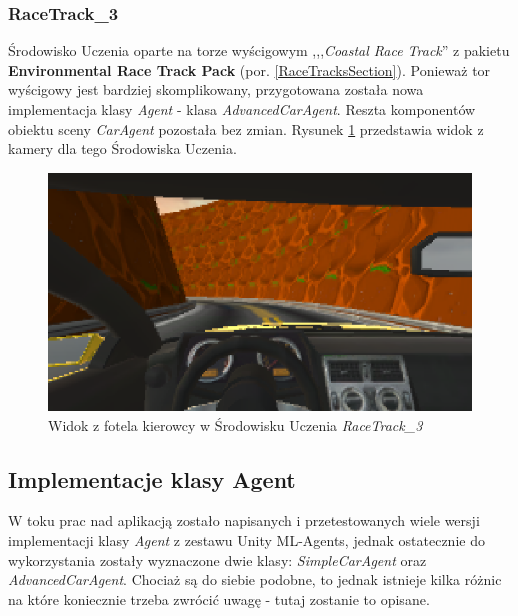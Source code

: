 \subsubsection{RaceTrack\_3}
Środowisko Uczenia oparte na torze wyścigowym ,,,\textit{Coastal Race Track}'' z pakietu \textbf{Environmental Race Track Pack} (por. \ref{RaceTracksSection}). Ponieważ tor wyścigowy jest bardziej skomplikowany, przygotowana została nowa implementacja klasy \textit{Agent} - klasa \textit{AdvancedCarAgent}. Reszta komponentów obiektu sceny \textit{CarAgent} pozostała bez zmian. Rysunek \ref{RaceTrack3Cockpit} przedstawia widok z kamery dla tego Środowiska Uczenia. \\

\begin{figure}[h]
\begin{center}
\includegraphics[width=15cm]{resources/figures/race_track_3_cockpit.png}
\caption{Widok z fotela kierowcy w Środowisku Uczenia \textit{RaceTrack\_3}}
\label{RaceTrack3Cockpit}
\end{center}
\end{figure}

\subsection{Implementacje klasy Agent}
\label{AgentImplementations}
W toku prac nad aplikacją zostało napisanych i przetestowanych wiele wersji implementacji klasy \textit{Agent} z zestawu Unity ML-Agents, jednak ostatecznie do wykorzystania zostały wyznaczone dwie klasy: \textit{SimpleCarAgent} oraz \textit{AdvancedCarAgent}. Chociaż są do siebie podobne, to jednak istnieje kilka różnic na które koniecznie trzeba zwrócić uwagę - tutaj zostanie to opisane.

